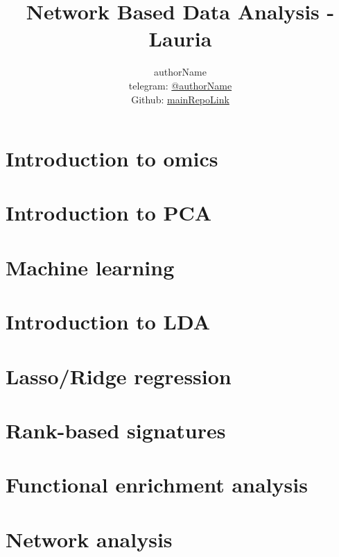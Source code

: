 
\title{\Huge\textbf{Network Based Data Analysis - Lauria}}
\author{
  authorName \\
  \small telegram: \href{telegramLink}{@authorName} \\[3pt]
\small Github: \href{mainRepoLink}{mainRepoLink}}



\maketitle
\tableofcontents
  
  \part{Introduction to omics}

    
    

  \part{Introduction to PCA}

    

  \part{Machine learning}
    

  \part{Introduction to LDA}

  \part{Lasso/Ridge regression}

  \part{Rank-based signatures}

  \part{Functional enrichment analysis}

  \part{Network analysis}


